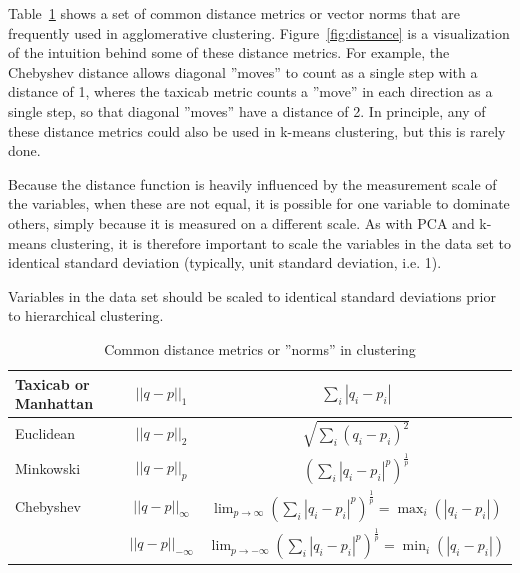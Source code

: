 Table~\ref{tab:distance} shows a set of common distance metrics or vector norms that are frequently used in agglomerative clustering. Figure~\ref{fig:distance} is a visualization of the intuition behind some of these distance metrics. For example, the Chebyshev distance allows diagonal ''moves'' to count as a single step with a distance of 1, wheres the taxicab metric counts a ''move'' in each direction as a single step, so that diagonal ''moves'' have a distance of 2. In principle, any of these distance metrics could also be used in k-means clustering, but this is rarely done.

Because the distance function is heavily influenced by the measurement scale of the variables, when these are not equal, it is possible for one variable to dominate others, simply because it is measured on a different scale. As with PCA and k-means clustering, it is therefore important to scale the variables in the data set to identical standard deviation (typically, unit standard deviation, i.e. 1). 

\begin{tcolorbox}[colback=alert]
Variables in the data set should be scaled to identical standard deviations prior to hierarchical clustering.
\end{tcolorbox}


\begin{table}
\renewcommand{\arraystretch}{2}
\centering 
\begin{tabular}{l|c|c} \hline
\begin{minipage}{1.75cm}Taxicab or Manhattan\end{minipage} & $ ||q-p||_1 $ & $\displaystyle \sum_i | q_i - p_i |$ \\ \hline
Euclidean & $ ||q-p||_2$ & $\displaystyle \sqrt{ \sum_i (q_i-p_i)^2}$ \\ \hline
Minkowski & $||q-p||_p$ & $\displaystyle \left( \sum_i | q_i - p_i |^p \right)^{\frac{1}{p}}$ \\ \hline
Chebyshev & $||q-p||_\infty$ & $\displaystyle \lim_{p \rightarrow \infty} \left( \sum_i | q_i - p_i |^p \right)^{\frac{1}{p}} = \max_i( | q_i - p_i | )$ \\ \hline
  & $||q-p||_{-\infty}$ & $\displaystyle \lim_{p \rightarrow -\infty} \left( \sum_i | q_i - p_i |^p \right)^{\frac{1}{p}} = \min_i( | q_i - p_i | )$ \\ \hline
\end{tabular}
\caption{Common distance metrics or ''norms'' in clustering}
\label{tab:distance}
\end{table}

